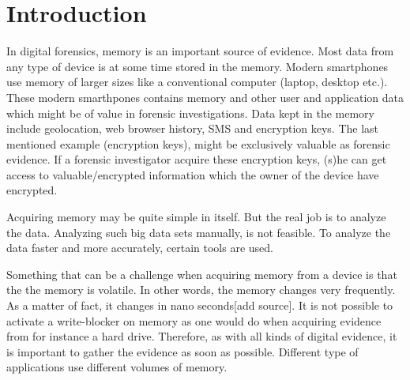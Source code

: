 \section{Introduction}


In digital forensics, memory is an important source of evidence. Most data from any type of device
is at some time stored in the memory.
Modern smartphones use memory of larger sizes like a conventional computer (laptop, desktop etc.).
These modern smarthpones contains memory and other user and application data which
might be of value in forensic investigations.
Data kept in the memory include geolocation, web browser history, SMS and encryption keys.
The last mentioned example (encryption keys), might be exclusively valuable as forensic evidence.
If a forensic investigator acquire these encryption keys, (s)he can get access to valuable/encrypted
information which the owner of the device have encrypted.

Acquiring memory may be quite simple in itself. But the real job is to analyze the data. Analyzing such
big data sets manually, is not feasible. To analyze the data faster and more accurately, certain tools
are used.

Something that can be a challenge when acquiring memory from a device is that the the memory is volatile.
In other words, the memory changes very frequently. As a matter of fact, it changes in nano
seconds[add source]. It is not possible to activate a write-blocker on memory as one would do when acquiring
evidence from for instance a hard drive. Therefore, as with all kinds of digital evidence, it is important to
gather the evidence as soon as possible. %
Different type of applications use different volumes of memory.



%
%

